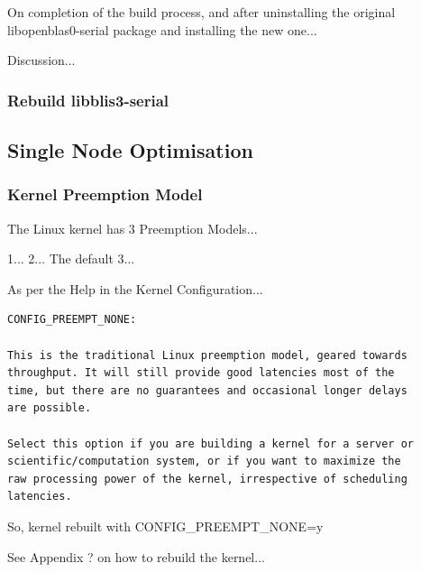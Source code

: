 \documentclass{report}
\begin{document}
On completion of the build process, and after uninstalling the original libopenblas0-serial package and installing the new one...


Discussion...


%
%
\subsubsection{Rebuild libblis3-serial}


%
%
\subsection{Single Node Optimisation}


%
%
\subsubsection{Kernel Preemption Model}

The Linux kernel has 3 Preemption Models...

1...
2... The default
3...


As per the Help in the Kernel Configuration...

\lstset{style=listingstyle}
\begin{lstlisting}[numbers=none, caption=Kernel Configuration Preemption Model Help]
CONFIG_PREEMPT_NONE:                                                                                                                                                                                                                                                 

This is the traditional Linux preemption model, geared towards
throughput. It will still provide good latencies most of the
time, but there are no guarantees and occasional longer delays
are possible.                                                                                                                       

Select this option if you are building a kernel for a server or
scientific/computation system, or if you want to maximize the
raw processing power of the kernel, irrespective of scheduling
latencies.
\end{lstlisting}

So, kernel rebuilt with CONFIG\_PREEMPT\_NONE=y

See Appendix ? on how to rebuild the kernel...
\end{document}
